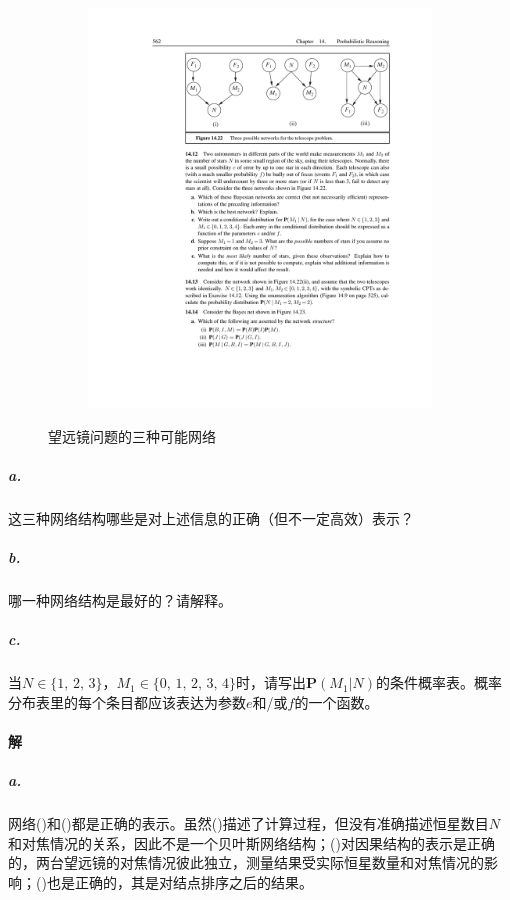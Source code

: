 \documentclass{article}
\begin{document}
\begin{figure}
\begin{subfigure}[t]{0.3\textwidth}
        \includegraphics[scale = 0.7]{Figure/14-22(iii).pdf}
        \caption{}
        \label{14.22(iii)}
    \end{subfigure}
    \caption{望远镜问题的三种可能网络}
    \label{14.22}
\end{figure}
\subparagraph{a.} 这三种网络结构哪些是对上述信息的正确（但不一定高效）表示？
\subparagraph{b.} 哪一种网络结构是最好的？请解释。
\subparagraph{c.} 当$N \in \{1,\, 2,\, 3\}$，$M_1 \in \{0,\, 1,\, 2,\, 3,\, 4\}$时，请写出$\mathbf{P}(M_1 | N)$的条件概率表。概率分布表里的每个条目都应该表达为参数$e$和/或$f$的一个函数。

\paragraph{解}
\subparagraph{a.}
网络()和()都是正确的表示。虽然()描述了计算过程，但没有准确描述恒星数目$N$和对焦情况的关系，因此不是一个贝叶斯网络结构；()对因果结构的表示是正确的，两台望远镜的对焦情况彼此独立，测量结果受实际恒星数量和对焦情况的影响；()也是正确的，其是对结点排序之后的结果。
\end{document}
